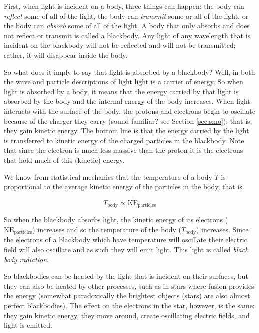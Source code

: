 \documentclass{article}
\theoremstyle{definition}
\begin{document}
\bigskip
\noindent
First, when light is incident on a body, three things can happen:
the body can \emph{reflect} some of all of the light, the body
can \emph{transmit} some or all of the light, or the body can
\emph{absorb} some of all of the light. A body that only absorbs
and does not reflect or transmit is called a blackbody. Any
light of any wavelength that is incident on the blackbody will
not be reflected and will not be transmitted; rather, it will
disappear inside the body.

\bigskip
\noindent
So what does it imply to say that light is absorbed by a
blackbody? Well, in both the wave and particle descriptions of
light light is a carrier of energy. So when light is absorbed by
a body, it means that the energy carried by that light is
absorbed by the body and the internal energy of the body
increases. When light interacts with the surface of the body, the
protons and electrons begin to oscillate because of the charger
they carry (sound familiar?  see Section \ref{sec:smo}); that is,
they gain kinetic energy. The bottom line is that the energy
carried by the light is transferred to kinetic energy of the
charged particles in the blackbody. Note that since the electron
is much less massive than the proton it is the electrons that
hold much of this (kinetic) energy.

\bigskip
\noindent
We know from statistical mechanics that the temperature of a body
$T$ is proportional to the average kinetic energy of the
particles in the body, that is

\begin{equation*}
T_{\text{body}} \propto \overline{\text{KE}}_{\text{particles}}
\end{equation*}

\bigskip
\noindent
So when the blackbody absorbs light, the kinetic energy of its
electrons ($\overline{\text{KE}}_{\text{particles}}$) increases
and so the temperature of the body ($T_{\text{body}}$) increases.
Since the electrons of a blackbody which have temperature will
oscillate their electric field will also oscillate and as such
they will emit light.  This light is called \emph{black body
radiation}.

\bigskip
\noindent
So blackbodies can be heated by the light that is incident on
their surfaces, but they can also be heated by other processes,
such as in stars where fusion provides the energy (somewhat
paradoxically the brightest objects (stars) are also almost
perfect blackbodies).  The effect on the electrons in the star,
however, is the same: they gain kinetic energy, they move around,
create oscillating electric fields, and light is emitted.
\end{document}
